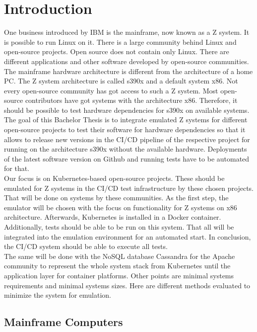 \chapter{Introduction}\label{ch:intro}

One business introduced by IBM is the mainframe, now known as a Z system. It is possible to run Linux on it. There is a large community behind Linux and open-source projects. Open source does not contain only \gls{Linux}. There are different applications and other software developed by open-source communities. The mainframe hardware architecture is different from the architecture of a home PC. The Z system architecture is called \gls{s390x} and a default system \gls{x86}. Not every open-source community has got access to such a Z system. Most open-source contributors have got systems with the architecture x86. Therefore, it should be possible to test hardware dependencies for s390x on available systems. The goal of this Bachelor Thesis is to integrate emulated Z systems for different open-source projects to test their software for hardware dependencies so that it allows to release new versions in the CI/CD pipeline of the respective project for running on the architecture s390x without the available hardware. Deployments of the latest software version on Github and running tests have to be automated for that.\\
Our focus is on Kubernetes-based open-source projects. These should be emulated for Z systems in the \gls{CI/CD} test infrastructure by these chosen projects. That will be done on systems by these communities. As the first step, the emulator will be chosen with the focus on functionality for Z systems on x86 architecture. Afterwards, Kubernetes is installed in a Docker container. Additionally, tests should be able to be run on this system. That all will be integrated into the emulation environment for an automated start. In conclusion, the CI/CD system should be able to execute all tests. \\
The same will be done with the NoSQL database Cassandra for the Apache community to represent the whole system stack from Kubernetes until the \gls{application layer} for container platforms. Other points are minimal systems requirements and minimal systems sizes. Here are different methods evaluated to minimize the system for emulation.


\section{Mainframe Computers}

